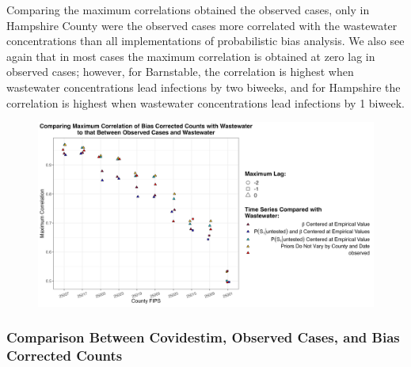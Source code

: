 \documentclass[12pt,twoside]{smiththesis}
\begin{document}
Comparing the maximum correlations obtained the observed cases, only in Hampshire County were the observed cases more correlated with the wastewater concentrations than all implementations of probabilistic bias analysis. We also see again that in most cases the maximum correlation is obtained at zero lag in observed cases; however, for Barnstable, the correlation is highest when wastewater concentrations lead infections by two biweeks, and for Hampshire the correlation is highest when wastewater concentrations lead infections by 1 biweek.
\begin{figure}
\includegraphics[width=1\linewidth]{figure/correlation_observed_pb} \caption{\label{fig:correlation_observed_pb}}\label{fig:unnamed-chunk-83}
\end{figure}
\hypertarget{comparison-between-covidestim-observed-cases-and-bias-corrected-counts}{%
\subsubsection{Comparison Between Covidestim, Observed Cases, and Bias Corrected Counts}\label{comparison-between-covidestim-observed-cases-and-bias-corrected-counts}}
\end{document}
